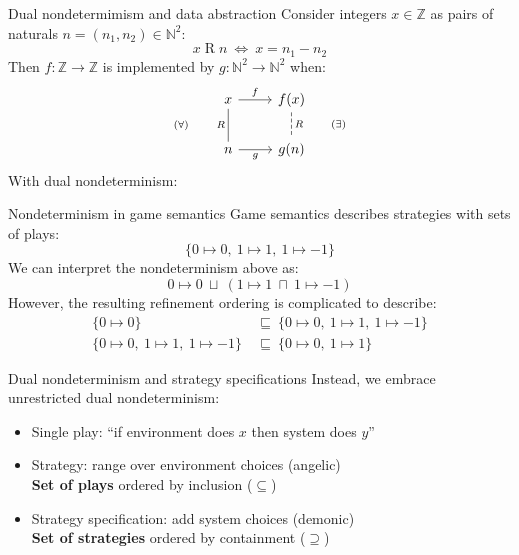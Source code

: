 \documentclass{beamer}
\begin{document}
\begin{frame}[fragile]{Dual nondetermimism and data abstraction} %
  Consider integers $x \in \mathbb{Z}$
  as pairs of naturals $n = (n_1, n_2) \in \mathbb{N}^2$:
  \[
      x \mathrel{R} n \: \Leftrightarrow \:
      x = n_1 - n_2
  \]
  \pause
  Then
  $f : \mathbb{Z} \rightarrow \mathbb{Z}$ is implemented by
  $g : \mathbb{N}^2 \rightarrow \mathbb{N}^2$ when:
  \[
    \begin{tikzcd}
      x \ar[r, "f"] \ar[d, "(\forall) \qquad R"', dash] &
      f(x) \ar[d, "R \qquad (\exists)", dash, dashed] \\
      n \ar[r, "g"'] &
      g(n)
    \end{tikzcd}
  \]
  With dual nondeterminism:
\end{frame}

\begin{frame}{Nondeterminism in game semantics} %
  Game semantics describes strategies with sets of plays:
  \[
      \{ 0 \mapsto 0, \: 1 \mapsto 1, \: 1 \mapsto -1 \}
  \]
  \pause
  We can interpret the nondeterminism above as:
  \[
      0 \mapsto 0 \:\sqcup\: (1 \mapsto 1 \:\sqcap\: 1 \mapsto -1)
  \]
  \pause
  However, the resulting refinement ordering is complicated to describe:
  \begin{align*}
    \{ 0 \mapsto 0 \}
    \: &\sqsubseteq \:
    \{ 0 \mapsto 0, \: 1 \mapsto 1, \: 1 \mapsto -1 \}
    \\ 
    \{ 0 \mapsto 0, \: 1 \mapsto 1, \: 1 \mapsto -1 \}
    \: &\sqsubseteq \:
    \{ 0 \mapsto 0, \: 1 \mapsto 1 \}
  \end{align*}
\end{frame}

\begin{frame}{Dual nondeterminism and strategy specifications} %
Instead, we embrace unrestricted dual nondeterminism:
\begin{itemize}[<+->]
  \item Single play: ``if environment does $x$ then system does $y$''
  \item Strategy: range over environment choices (angelic) \\
    \textbf{Set of plays} ordered by inclusion ($\subseteq$)
  \item Strategy specification: add system choices (demonic) \\
    \textbf{Set of strategies} ordered by containment ($\supseteq$)
\end{itemize}
\end{frame}
\end{document}
